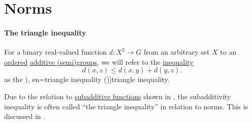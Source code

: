 \section{Norms}\label{sec:norms}

\paragraph{The triangle inequality}

\begin{definition}\label{def:triangle_inequality}\mimprovised
  For a binary real-valued function \( d: X^2 \to G \) from an arbitrary set \( X \) to an \hyperref[def:ordered_semigroup]{ordered} \hyperref[con:additive_semigroup]{additive (semi)groups}, we will refer to the \hyperref[def:inequality]{inequality}
  \begin{equation}\label{eq:def:triangle_inequality}
    d(x, z) \leq d(x, y) + d(y, z).
  \end{equation}
  as the \term[ru=неравенство треугольника (\cite[436]{Натансон1974ВещественныйАнализ}), en=triangle inequality (\cite[\S 1.4]{Rudin1987RealAndComplexAnalysis})]{triangle inequality}.
\end{definition}
\begin{comments}
  \item Due to the relation to \hyperref[def:additive_function/sub]{subadditive functions} shown in , the subadditivity inequality is often called \enquote{the triangle inequality} in relation to norms. This is discussed in .
\end{comments}

